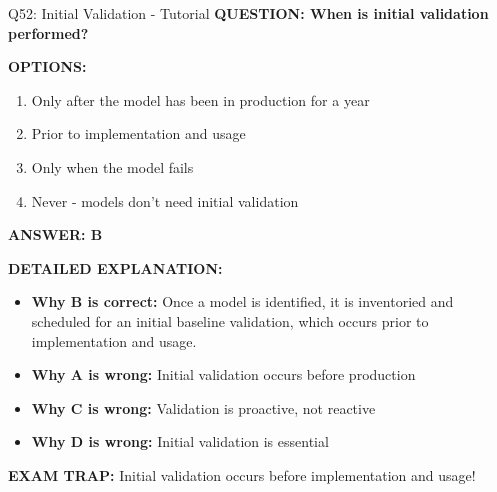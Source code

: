 \documentclass[8pt]{beamer}
\begin{document}
	\begin{frame}{Q52: Initial Validation - Tutorial}
		\fontsize{6.5}{7.5}\selectfont
		\textbf{QUESTION: When is initial validation performed?}
		
		\vspace{0.1cm}
		\textbf{OPTIONS:}
		\begin{enumerate}
			\item Only after the model has been in production for a year
			\item Prior to implementation and usage
			\item Only when the model fails
			\item Never - models don't need initial validation
		\end{enumerate}
		
		\vspace{0.1cm}
		\textcolor{myblue}{\textbf{ANSWER: B}}
		
		\vspace{0.1cm}
		\textbf{DETAILED EXPLANATION:}
		\begin{itemize}
			\item \textbf{Why B is correct:} Once a model is identified, it is inventoried and scheduled for an initial baseline validation, which occurs prior to implementation and usage.
			\item \textbf{Why A is wrong:} Initial validation occurs before production
			\item \textbf{Why C is wrong:} Validation is proactive, not reactive
			\item \textbf{Why D is wrong:} Initial validation is essential
		\end{itemize}
		
		\textcolor{myred}{\textbf{EXAM TRAP:}} Initial validation occurs \textcolor{myblue}{before implementation and usage}!
	\end{frame}
	
\end{document}
